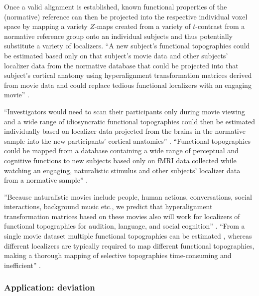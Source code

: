 %
Once a valid alignment is established, known functional properties of the
(normative) reference can then be projected into the respective individual voxel
space by mapping a variety $Z$-maps created from a variety of $t$-contrast from
a normative reference group onto an individual subjects and thus potentially
substitute a variety of localizers.
%
``A new subject's functional topographies could be estimated based only on that
subject's movie data and other subjects' localizer data from the normative
database that could be projected into that subject's cortical anatomy using
hyperalignment transformation matrices derived from movie data and could replace
tedious functional localizers with an engaging movie''
\citep{jiahui2020predicting}.

%
``Investigators would need to scan their participants only during movie viewing
and a wide range of idiosyncratic functional topographies could then be
estimated individually based on localizer data projected from the brains in the
normative sample into the new participants' cortical anatomies''
\citep{jiahui2020predicting}.
%
``Functional topographies could be mapped from a database containing a wide
range of perceptual and cognitive functions to new subjects based only on fMRI
data collected while watching an engaging, naturalistic stimulus and other
subjects' localizer data from a normative sample'' \citep{jiahui2020predicting}.

%
''Because naturalistic movies include people, human actions, conversations,
social interactions, background music etc., we predict that hyperalignment
transformation matrices based on these movies also will work for localizers of
functional topographies for audition, language, and social cognition''
\citep{jiahui2020predicting}.
%
``From a single movie dataset multiple functional topographies can be estimated
\citep{guntupalli2016model}, whereas different localizers are typically required
to map different functional topographies, making a thorough mapping of selective
topographies time-consuming and inefficient'' \citep{jiahui2020predicting}.



\subsubsection{Application: deviation}



